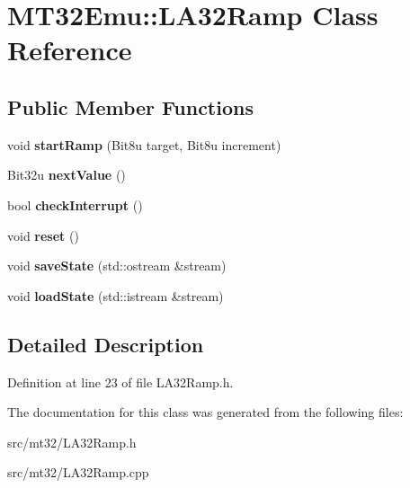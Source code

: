 \hypertarget{classMT32Emu_1_1LA32Ramp}{\section{M\-T32\-Emu\-:\-:L\-A32\-Ramp Class Reference}
\label{classMT32Emu_1_1LA32Ramp}
}
\subsection*{Public Member Functions}
\begin{DoxyCompactItemize}
\item 
\hypertarget{classMT32Emu_1_1LA32Ramp_a946a358a001ac84d7a0c2b2c53d142d9}{void {\bfseries start\-Ramp} (Bit8u target, Bit8u increment)}\label{classMT32Emu_1_1LA32Ramp_a946a358a001ac84d7a0c2b2c53d142d9}

\item 
\hypertarget{classMT32Emu_1_1LA32Ramp_a19b2e86b1fed581c657231f6122927e4}{Bit32u {\bfseries next\-Value} ()}\label{classMT32Emu_1_1LA32Ramp_a19b2e86b1fed581c657231f6122927e4}

\item 
\hypertarget{classMT32Emu_1_1LA32Ramp_aad79287bb5156ee0c76f71e15d58cfbd}{bool {\bfseries check\-Interrupt} ()}\label{classMT32Emu_1_1LA32Ramp_aad79287bb5156ee0c76f71e15d58cfbd}

\item 
\hypertarget{classMT32Emu_1_1LA32Ramp_ad753157784445249126d82a2875429a9}{void {\bfseries reset} ()}\label{classMT32Emu_1_1LA32Ramp_ad753157784445249126d82a2875429a9}

\item 
\hypertarget{classMT32Emu_1_1LA32Ramp_ab7f9ac8e17f7e18f9c5c52bb69c557b9}{void {\bfseries save\-State} (std\-::ostream \&stream)}\label{classMT32Emu_1_1LA32Ramp_ab7f9ac8e17f7e18f9c5c52bb69c557b9}

\item 
\hypertarget{classMT32Emu_1_1LA32Ramp_ae62855aa5abbf5cf06aa9c8010d157de}{void {\bfseries load\-State} (std\-::istream \&stream)}\label{classMT32Emu_1_1LA32Ramp_ae62855aa5abbf5cf06aa9c8010d157de}

\end{DoxyCompactItemize}


\subsection{Detailed Description}


Definition at line 23 of file L\-A32\-Ramp.\-h.



The documentation for this class was generated from the following files\-:\begin{DoxyCompactItemize}
\item 
src/mt32/L\-A32\-Ramp.\-h\item 
src/mt32/L\-A32\-Ramp.\-cpp\end{DoxyCompactItemize}
